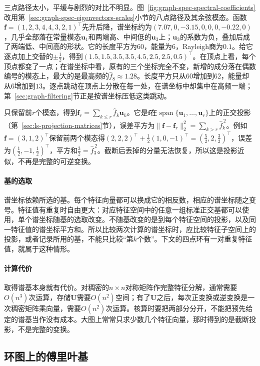 三点路径太小，平缓与剧烈的对比不明显。图~\ref{fig:graph-spec-spectral-coefficients}改用第~\ref{sec:graph-spec-eigenvectors-scales}小节的八点路径及其余弦模态。函数$\bm f=(1,2,3,4,4,3,2,1)^{\top}$先升后降，谱坐标约为$(7.07,0,-3.15,0,0,0,-0.22,0)$，几乎全部落在常量模态$\bm u_1$和两端高、中间低的$\bm u_3$上；$\bm u_3$的系数为负，叠加后成了两端低、中间高的形状。它的长度平方为$60$，能量为$6$，Rayleigh商为$0.1$。给它逐点加上交替的$\pm\frac12$，得到$(1.5,1.5,3.5,3.5,4.5,2.5,2.5,0.5)^{\top}$。在顶点上看，每个顶点都变了一点；在谱坐标中看，原有的三个坐标完全不变，新增的成分落在偶数编号的模态上，最大的是最高频的$\widehat f_8\approx1.28$。长度平方只从$60$增加到$62$，能量却从$6$增加到$13$。逐点跳动在顶点上分散在每一处，在谱坐标中却集中在高频一端；第~\ref{sec:graph-filtering}节正是按谱坐标压低这类跳动。

只保留前$r$个模态，得到$\bm f_r=\sum_{k\leq r}\widehat f_k\bm u_k$。它是$\bm f$在$\operatorname{span}\{\bm u_1,\ldots,\bm u_r\}$上的正交投影（第~\ref{sec:ls-projection-matrices}节），误差平方为$\lVert\bm f-\bm f_r\rVert_2^2=\sum_{k>r}\widehat f_k^{\,2}$。例如$\bm f=(3,1,2)^{\top}$保留前两个模态得$(2,2,2)^{\top}+\tfrac12(1,0,-1)^{\top}=(\tfrac52,2,\tfrac32)^{\top}$，误差为$(\tfrac12,-1,\tfrac12)^{\top}$，平方和$\tfrac32=\widehat f_3^{\,2}$。截断后丢掉的分量无法恢复，所以这是投影近似，不再是完整的可逆变换。

\paragraph{基的选取}
谱坐标依赖所选的基。每个特征向量都可以换成它的相反数，相应的谱坐标随之变号。特征值有重复时自由更大：对应特征空间中的任意一组标准正交基都可以使用，单个谱坐标随基的选取改变。不随基改变的是到每个特征空间的投影，以及同一特征值的谱坐标平方和。所以比较两次计算的谱坐标时，应比较特征子空间上的投影，或者记录所用的基，不能只比较“第$k$个数”。下文的四点环有一对重复特征值，就属于这种情形。

\paragraph{计算代价}
取得谱基本身就有代价。对稠密的$n\times n$对称矩阵作完整特征分解，通常需要$O(n^3)$次运算，存储$\bm U$需要$O(n^2)$空间；有了$\bm U$之后，每次正变换或逆变换是一次稠密矩阵乘向量，需要$O(n^2)$次运算。核算时要把两部分分开，不能把预先给定的谱基当作没有成本。大图上常常只求少数几个特征向量，那时得到的是截断投影，不是完整的变换。

\subsection{环图上的傅里叶基}
\label{sec:graph-spec-cycle-fourier-basis}

